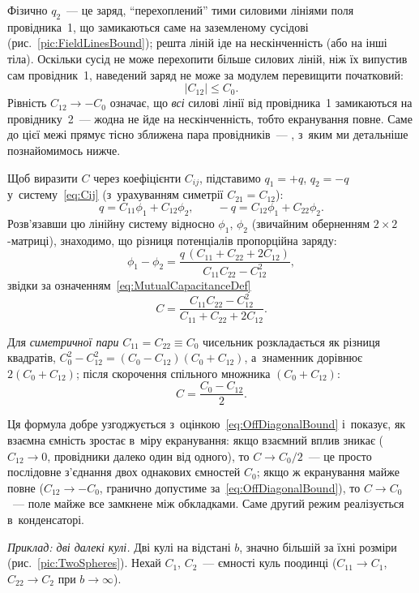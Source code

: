 \begin{Extra}

Фізично \(q_2\)~--- це заряд, \enquote{перехоплений} тими силовими лініями поля
провідника~1, що замикаються саме на заземленому сусідові
(рис.~\ref{pic:FieldLinesBound}); решта ліній іде на нескінченність (або на інші тіла).
Оскільки сусід не може перехопити більше силових ліній, ніж їх випустив сам провідник~1,
наведений заряд не може за модулем перевищити початковий:
\begin{equation}\label{eq:OffDiagonalBound}
	|C_{12}| \le C_0.
\end{equation}
Рівність \(C_{12}\to -C_0\) означає, що \emph{всі} силові лінії від провідника~1
замикаються на провіднику~2~--- жодна не йде на нескінченність, тобто екранування повне.
Саме до цієї межі прямує тісно зближена пара провідників~--- , з~яким
ми детальніше познайомимось нижче.

Щоб виразити \(C\) через коефіцієнти \(C_{ij}\), підставимо \(q_1=+q\), \(q_2=-q\)
у~систему~\eqref{eq:Cij} (з~урахуванням симетрії \(C_{21}=C_{12}\)):
\begin{equation*}
	q = C_{11}\phi_1 + C_{12}\phi_2, \qquad
	-q = C_{12}\phi_1 + C_{22}\phi_2.
\end{equation*}
Розв'язавши цю лінійну систему відносно \(\phi_1\), \(\phi_2\) (звичайним оберненням
\(2\times2\)-матриці), знаходимо, що різниця потенціалів пропорційна заряду:
\begin{equation*}
	\phi_1 - \phi_2 = \frac{q\,(C_{11}+C_{22}+2C_{12})}{C_{11}C_{22}-C_{12}^2},
\end{equation*}
звідки за означенням~\eqref{eq:MutualCapacitanceDef}
\begin{equation}\label{eq:MutualCapacitanceGeneral}
	C = \frac{C_{11}C_{22}-C_{12}^2}{C_{11}+C_{22}+2C_{12}}.
\end{equation}

Для \emph{симетричної пари} \(C_{11}=C_{22}\equiv C_0\) чисельник розкладається як
різниця квадратів, \(C_0^2-C_{12}^2=(C_0-C_{12})(C_0+C_{12})\), а~знаменник дорівнює
\(2(C_0+C_{12})\); після скорочення спільного множника \((C_0+C_{12})\):
\begin{equation}\label{eq:SymmetricPairCap}
	C = \frac{C_0 - C_{12}}{2}.
\end{equation}

Ця формула добре узгоджується з~оцінкою~\eqref{eq:OffDiagonalBound} і~показує, як взаємна
ємність зростає в~міру екранування: якщо взаємний вплив зникає (\(C_{12}\to 0\),
провідники далеко один від одного), то \(C\to C_0/2\)~--- це просто послідовне з'єднання
двох однакових ємностей \(C_0\); якщо ж екранування майже повне (\(C_{12}\to -C_0\),
гранично допустиме за~\eqref{eq:OffDiagonalBound}), то \(C\to C_0\)~--- поле майже все
замкнене між обкладками. Саме другий режим реалізується в~конденсаторі.

\emph{Приклад: дві далекі кулі.} Дві кулі на відстані \(b\), значно більшій за їхні
розміри (рис.~\ref{pic:TwoSpheres}). Нехай \(C_1\), \(C_2\)~--- ємності куль поодинці
(\(C_{11}\to C_1\), \(C_{22}\to C_2\) при \(b\to\infty\)).

\end{Extra}

